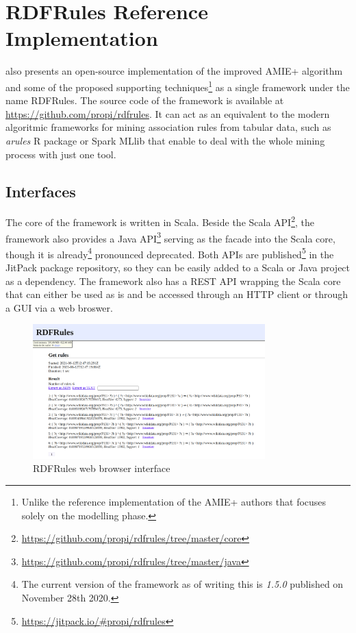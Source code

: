 \chapter{RDFRules Reference Implementation\label{rdfrules}}

\cite{Zeman2020} also presents an open-source implementation of the improved AMIE+ algorithm and some of the proposed supporting techniques\footnote{Unlike the reference implementation of the AMIE+ authors that focuses solely on the modelling phase.} as a single framework under the name RDFRules. The source code of the framework is available at \href{https://github.com/propi/rdfrules}{https://github.com/propi/rdfrules}. It can act as an equivalent to the modern algoritmic frameworks for mining association rules from tabular data, such as \textit{arules} R package or Spark MLlib that enable to deal with the whole mining process with just one tool.

\section{Interfaces}

The core of the framework is written in Scala. Beside the Scala API\footnote{\href{https://github.com/propi/rdfrules/tree/master/core}{https://github.com/propi/rdfrules/tree/master/core}}, the framework also provides a Java API\footnote{\href{https://github.com/propi/rdfrules/tree/master/java}{https://github.com/propi/rdfrules/tree/master/java}} serving as the facade into the Scala core, though it is already\footnote{The current version of the framework as of writing this is \textit{1.5.0} published on November 28th 2020.} pronounced deprecated. Both APIs are published\footnote{\href{https://jitpack.io/\#propi/rdfrules}{https://jitpack.io/\#propi/rdfrules}} in the JitPack package repository, so they can be easily added to a Scala or Java project as a dependency. The framework also has a REST API wrapping the Scala core that can either be used as is and be accessed through an HTTP client or through a GUI via a web broswer.

\begin{figure}[h]
\centering
\includegraphics[width=0.8\textwidth]{img/gui-getrules.png}
\caption{RDFRules web browser interface}
\label{rdfrulesgui}
\end{figure}

